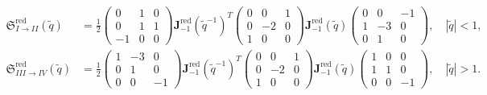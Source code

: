 \documentclass[12pt,reqno]{amsart}
\theoremstyle{definition}
\def\tq{\tilde{q}}
\def\-{\,-\,}
\def\bJ{\mathbf J}
\def\RED{\mathrm{red}}
\def\mf{\mathfrak}
\begin{document}
\begin{subequations}
\begin{align}
\mf{S}^{\text{red}}_{I\rightarrow II}(\tq)
&=\frac{1}{2}
\begin{pmatrix}
0&1&0\\0&1&1\\-1&0&0
\end{pmatrix}\bJ^\RED_{-1}(\tq^{-1})^T
\begin{pmatrix}
0&0&1\\0&-2&0\\1&0&0
\end{pmatrix}\bJ^\RED_{-1}(\tq)
\begin{pmatrix}
0&0&-1\\1&-3&0\\0&1&0
\end{pmatrix},
\quad
|\tq|<1,\label{eq:SRed12}
\\
\mf{S}^{\text{red}}_{III\rightarrow IV}(\tq)
&=\frac{1}{2}
\begin{pmatrix}
      1&-3&0\\0&1&0\\0&0&-1
\end{pmatrix}\bJ^\RED_{-1}(\tq^{-1})^T
\begin{pmatrix}
  0&0&1\\0&-2&0\\1&0&0
\end{pmatrix}\bJ^\RED_{-1}(\tq)
\begin{pmatrix}
  1&0&0\\1&1&0\\0&0&-1
\end{pmatrix},
\quad |\tq| > 1.
\label{eq:SRed34}
\end{align}
\end{subequations}
\end{document}
